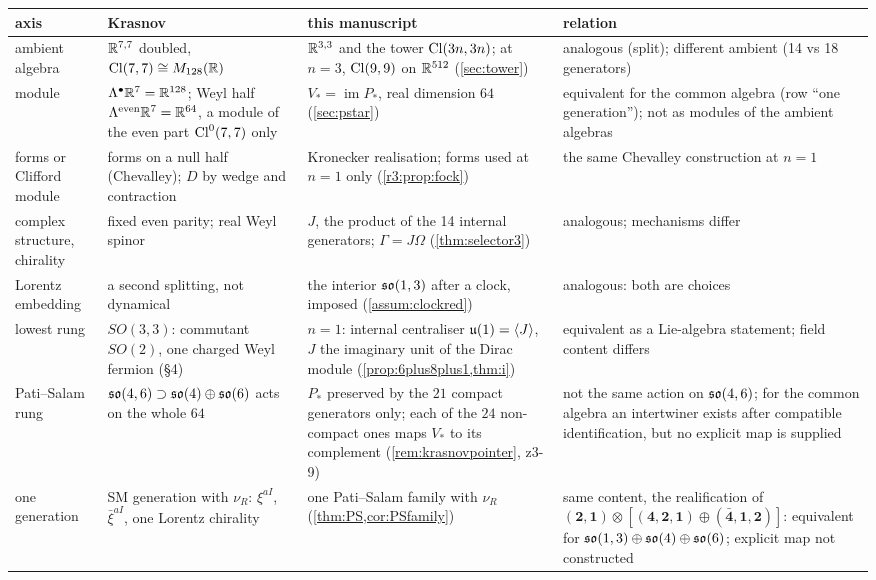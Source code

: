 \begin{table}[t]
\centering
\footnotesize
\begin{tabular}{@{}>{\raggedright\arraybackslash}p{2.4cm}>{\raggedright\arraybackslash}p{4.0cm}>{\raggedright\arraybackslash}p{4.6cm}>{\raggedright\arraybackslash}p{3.6cm}@{}}
\toprule
axis & Krasnov \cite{Krasnov18} & this manuscript & relation\\
\midrule
ambient algebra & $\mathbb{R}^{7,7}$ doubled, $\mathrm{Cl}(7,7)\cong M_{128}(\mathbb{R})$ & $\mathbb{R}^{3,3}$ and the tower $\mathrm{Cl}(3n,3n)$; at $n=3$, $\mathrm{Cl}(9,9)$ on $\mathbb{R}^{512}$ (\cref{sec:tower}) & analogous (split); different ambient (14 vs 18 generators)\\
module & $\Lambda^\bullet\mathbb{R}^7=\mathbb{R}^{128}$; Weyl half $\Lambda^{\rm even}\mathbb{R}^7=\mathbb{R}^{64}$, a module of the even part $\mathrm{Cl}^0(7,7)$ only & $V_*=\operatorname{im}P_*$, real dimension $64$ (\cref{sec:pstar}) & equivalent for the common algebra (row ``one generation''); not as modules of the ambient algebras\\
forms or Clifford module & forms on a null half (Chevalley); $D$ by wedge and contraction & Kronecker realisation; forms used at $n=1$ only (\cref{r3:prop:fock}) & the same Chevalley construction at $n=1$\\
complex structure, chirality & fixed even parity; real Weyl spinor & $J$, the product of the 14 internal generators; $\Gamma=J\Omega$ (\cref{thm:selector3}) & analogous; mechanisms differ\\
Lorentz embedding & a second splitting, not dynamical & the interior $\mathfrak{so}(1,3)$ after a clock, imposed (\cref{assum:clockred}) & analogous: both are choices\\
lowest rung & $SO(3,3)$: commutant $SO(2)$, one charged Weyl fermion (\S4) & $n=1$: internal centraliser $\mathfrak{u}(1)=\langle J\rangle$, $J$ the imaginary unit of the Dirac module (\cref{prop:6plus8plus1,thm:i}) & equivalent as a Lie-algebra statement; field content differs\\
Pati--Salam rung & $\mathfrak{so}(4,6)\supset\mathfrak{so}(4)\oplus\mathfrak{so}(6)$ acts on the whole $64$ & $P_*$ preserved by the $21$ compact generators only; each of the $24$ non-compact ones maps $V_*$ to its complement (\cref{rem:krasnovpointer}, z3-9) & not the same action on $\mathfrak{so}(4,6)$; for the common algebra an intertwiner exists after compatible identification, but no explicit map is supplied\\
one generation & SM generation with $\nu_R$: $\xi^{aI}$, $\bar\xi^{aI}$, one Lorentz chirality & one Pati--Salam family with $\nu_R$ (\cref{thm:PS,cor:PSfamily}) & same content, the realification of $(\mathbf2,\mathbf1)\otimes[(\mathbf4,\mathbf2,\mathbf1)\oplus(\bar{\mathbf4},\mathbf1,\mathbf2)]$: equivalent for $\mathfrak{so}(1,3)\oplus\mathfrak{so}(4)\oplus\mathfrak{so}(6)$; explicit map not constructed\\

\end{tabular}
\end{table}
